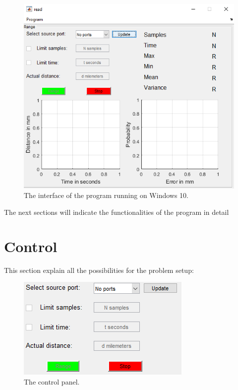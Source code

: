 \documentclass[a4paper, 21pt]{article} %
\begin{document}
\begin{figure}[H]
\begin{center}
\includegraphics[scale=.7]{fig/ss_ov.png}
\end{center}
\caption{The interface of the program running on Windows 10.}
\end{figure}

The next sections will indicate the functionalities of the program in detail

\section{Control}
This section explain all the possibilities for the problem setup:
\begin{figure}[!hbbp]
\begin{center}
\includegraphics[scale=.9]{fig/ss_control.png}
\end{center}
\caption{The control panel.}
\end{figure}
\end{document}
